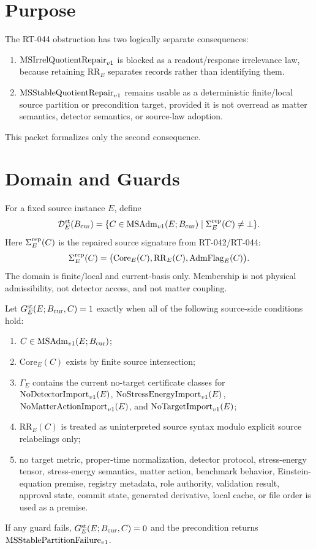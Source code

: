 \section{Purpose}

The RT-044 obstruction has two logically separate consequences:
\begin{enumerate}
  \item \(\mathrm{MSIrrelQuotientRepair}_{v1}\) is blocked as a readout/response irrelevance law,
    because retaining \(\mathrm{RR}_E\) separates records rather than
    identifying them.
  \item \(\mathrm{MSStableQuotientRepair}_{v1}\) remains usable as a deterministic finite/local
    source partition or precondition target, provided it is not overread as
    matter semantics, detector semantics, or source-law adoption.
\end{enumerate}
This packet formalizes only the second consequence.

\section{Domain and Guards}

\begin{definition}
For a fixed source instance \(E\), define
\[
  \mathcal D^{\mathrm{st}}_E(B_{\mathrm{cur}})
  =
  \{C\in\mathrm{MSAdm}_{v1}(E;B_{\mathrm{cur}})\mid \Sigma^{\mathrm{rep}}_E(C)\neq\bot\}.
\]
Here \(\Sigma^{\mathrm{rep}}_E(C)\) is the repaired source signature from RT-042/RT-044:
\[
  \Sigma^{\mathrm{rep}}_E(C)=
  \bigl(\mathrm{Core}_E(C),\mathrm{RR}_E(C),
  \mathrm{AdmFlag}_E(C)\bigr).
\]
The domain is finite/local and current-basis only. Membership is not physical
admissibility, not detector access, and not matter coupling.
\end{definition}

\begin{definition}
Let \(G^{\mathrm{st}}_E(E;B_{\mathrm{cur}},C)=1\) exactly when all of the following source-side
conditions hold:
\begin{enumerate}
  \item \(C\in\mathrm{MSAdm}_{v1}(E;B_{\mathrm{cur}})\);
  \item \(\mathrm{Core}_E(C)\) exists by finite source intersection;
  \item \(\Gamma_E\) contains the current no-target certificate classes for
    \(\mathrm{NoDetectorImport}_{v1}(E)\), \(\mathrm{NoStressEnergyImport}_{v1}(E)\), \(\mathrm{NoMatterActionImport}_{v1}(E)\), and \(\mathrm{NoTargetImport}_{v1}(E)\);
  \item \(\mathrm{RR}_E(C)\) is treated as uninterpreted source syntax
    modulo explicit source relabelings only;
  \item no target metric, proper-time normalization, detector protocol,
    stress-energy tensor, stress-energy semantics, matter action, benchmark
    behavior, Einstein-equation premise, registry metadata, role authority,
    validation result, approval state, commit state, generated derivative,
    local cache, or file order is used as a premise.
\end{enumerate}
If any guard fails, \(G^{\mathrm{st}}_E(E;B_{\mathrm{cur}},C)=0\) and the precondition returns
\(\mathrm{MSStablePartitionFailure}_{v1}\).
\end{definition}

